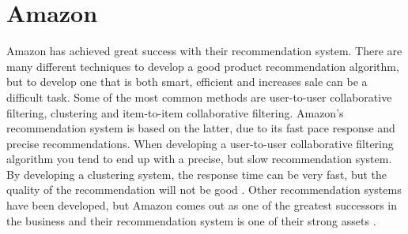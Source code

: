 \section{Amazon}
Amazon has achieved great success with their recommendation system. There are many different techniques to develop a good product recommendation algorithm, but to develop one that is both smart, efficient and increases sale can be a difficult task. Some of the most common methods are user-to-user collaborative filtering, clustering and item-to-item collaborative filtering. Amazon's recommendation system is based on the latter, due to its fast pace response and precise recommendations. When developing a user-to-user collaborative filtering algorithm you tend to end up with a precise, but slow recommendation system. By developing a clustering system, the response time can be very fast, but the quality of the recommendation will not be good \cite{AmazonRecommendations}. Other recommendation systems have been developed, but Amazon comes out as one of the greatest successors in the business and their recommendation system is one of their strong assets \cite{AmazonSuccess2}.
